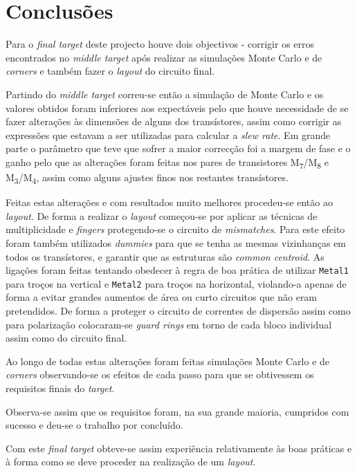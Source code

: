 \documentclass[11pt]{article}
\numberwithin{equation}{section}
\begin{document}
\pagebreak

\section{Conclusões}

Para o \textit{final target} deste projecto houve dois objectivos - corrigir os erros encontrados no \textit{middle target} após realizar as simulações Monte Carlo e de \textit{corners} e também fazer o \textit{layout} do circuito final.

Partindo do \textit{middle target} correu-se então a simulação de Monte Carlo e os valores obtidos foram inferiores aos expectáveis pelo que houve necessidade de se fazer alterações às dimensões de alguns dos transístores, assim como corrigir as expressões que estavam a ser utilizadas para calcular a \textit{slew rate}. Em grande parte o parâmetro que teve que sofrer a maior correcção foi a margem de fase e o ganho pelo que as alterações foram feitas nos pares de transistores M\textsubscript{7}/M\textsubscript{8} e M\textsubscript{3}/M\textsubscript{4}, assim como alguns ajustes finos nos restantes transístores.

Feitas estas alterações e com resultados muito melhores procedeu-se então ao \textit{layout}. De forma a realizar o \textit{layout} começou-se por aplicar as técnicas de multiplicidade e \textit{fingers} protegendo-se o circuito de \textit{mismatches}. Para este efeito foram também utilizados \textit{dummies} para que se tenha as mesmas vizinhanças em todos os transístores, e garantir que as estruturas são \textit{common centroid}. As ligações foram feitas tentando obedecer à regra de boa prática de utilizar \texttt{Metal1} para troços na vertical e \texttt{Metal2} para troços na horizontal, violando-a apenas de forma a evitar grandes aumentos de área ou curto circuitos que não eram pretendidos. De forma a proteger o circuito de correntes de dispersão assim como para polarização colocaram-se \textit{guard rings} em torno de cada bloco individual assim como do circuito final.

Ao longo de todas estas alterações foram feitas simulações Monte Carlo e de \textit{corners} observando-se os efeitos de cada passo para que se obtivessem os requisitos finais do \textit{target}.


Observa-se assim que os requisitos foram, na sua grande maioria, cumpridos com sucesso e deu-se o trabalho por concluído.

Com este \textit{final target} obteve-se assim experiência relativamente às boas práticas e à forma como se deve proceder na realização de um \textit{layout}.
\end{document}
